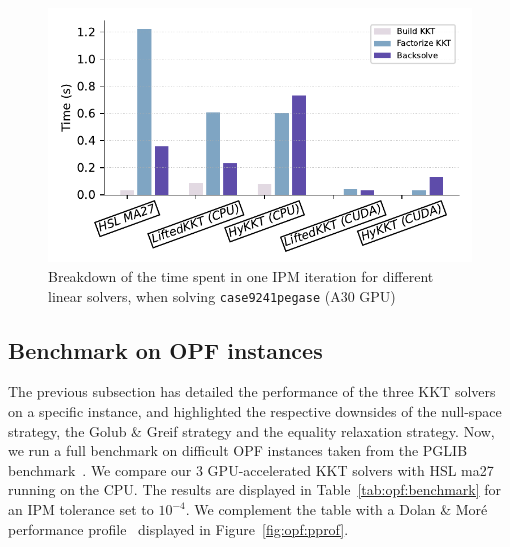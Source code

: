 \begin{figure}[!ht]
  \centering
  \includegraphics[width=.7\textwidth]{../figures/breakdown.pdf}
  \caption{Breakdown of the time spent in one IPM iteration
    for different linear solvers, when solving {\tt case9241pegase} (A30 GPU)
  \label{fig:timebreakdown}}
\end{figure}



\subsection{Benchmark on OPF instances}
The previous subsection has detailed the performance of the
three KKT solvers on a specific instance, and highlighted
the respective downsides of the null-space strategy,
the Golub \& Greif strategy and the equality relaxation strategy.
Now, we run a full benchmark on difficult OPF instances taken
from the PGLIB benchmark~\cite{babaeinejadsarookolaee2019power}.
We compare our 3 GPU-accelerated KKT solvers with HSL ma27 running
on the CPU. The results are displayed in Table~\ref{tab:opf:benchmark}
for an IPM tolerance set to $10^{-4}$.
We complement the table with a Dolan \& Moré performance profile~\cite{dolan2002benchmarking} displayed
in Figure~\ref{fig:opf:pprof}.

